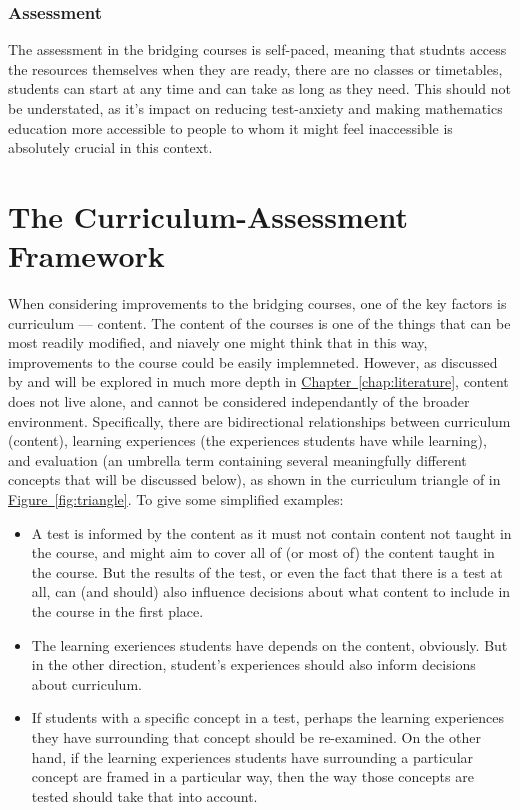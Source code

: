 \documentclass[twoside,12pt,a4paper]{report}
\newcommand{\refchap}[1]{\hyperref[chap:#1]{Chapter~\ref{chap:#1}}}
\newcommand{\reffig}[1]{\hyperref[fig:#1]{Figure~\ref{fig:#1}}}
\begin{document}
\subsubsection{Assessment}

The assessment in the bridging courses is self-paced, meaning that studnts access the resources themselves when they are ready, there are no classes or timetables, students can start at any time and can take as long as they need. This should not be understated, as it's impact on reducing test-anxiety and making mathematics education more accessible to people to whom it might feel inaccessible is absolutely crucial in this context.



\section{The Curriculum-Assessment Framework}
\label{sec:framework}

When considering improvements to the bridging courses, one of the key factors is curriculum --- content. The content of the courses is one of the things that can be most readily modified, and niavely one might think that in this way, improvements to the course could be easily implemneted. However, as discussed by \cite{Mohandas2003} and will be explored in much more depth in \refchap{literature}, content does not live alone, and cannot be considered independantly of the broader environment. Specifically, there are bidirectional relationships between curriculum (content), learning experiences (the experiences students have while learning), and evaluation (an umbrella term containing several meaningfully different concepts that will be discussed below), as shown in the curriculum triangle of  in \reffig{triangle}. To give some simplified examples: 
\begin{itemize}
	\item A test is informed by the content as it must not contain content not taught in the course, and might aim to cover all of (or most of) the content taught in the course. But the results of the test, or even the fact that there is a test at all, can (and should) also influence decisions about what content to include in the course in the first place.
	\item The learning exeriences students have depends on the content, obviously. But in the other direction, student's experiences should also inform decisions about curriculum. 
	\item If students 
 with a specific concept in a test, perhaps the learning experiences they have surrounding that concept should be re-examined. On the other hand, if the learning experiences students have surrounding a particular concept are framed in a particular way, then the way those concepts are tested should take that into account.
\end{itemize}
\end{document}
